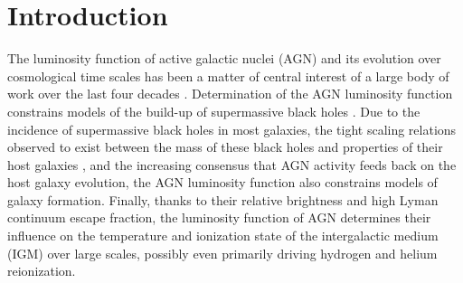 \documentclass[a4paper,fleqn,usenatbib]{mnras}
\begin{document}


\section{Introduction}

The luminosity function of active galactic nuclei (AGN) and its
evolution over cosmological time scales has been a matter of central
interest of a large body of work over the last four decades
\citep[e.g.,][]{1978A&A....68...17M, 1983ApJ...269..352S,
  1988ApJ...325...92K, 1988MNRAS.235..935B, 1993ApJ...406L..43H,
  1994ApJ...421..412W, 1995AJ....110...68S, 1995AJ....110.2553K,
  1995ApJ...438..623P, 2000MNRAS.317.1014B, 2001AJ....121...54F,
  2004AJ....128..515F, 2006AJ....131.2766R, 2007ApJ...654..731H,
  2009MNRAS.392...19C, 2010AJ....139..906W, 2011ApJ...728L..26G,
  2013ApJ...773...14R, 2013ApJ...768..105M, 2015AA...578A..83G,
  2015ApJ...798...28K, 2016ApJ...829...33Y, 2016ApJ...833..222J,
  2017MNRAS.466.1160M}.  Determination of the AGN luminosity function
constrains models of the build-up of supermassive black holes
\citep{2015MNRAS.452..575S, 2016MNRAS.462..190R}.  Due to the
incidence of supermassive black holes in most galaxies, the tight
scaling relations observed to exist between the mass of these black
holes and properties of their host galaxies
\citep{2013ARA&A..51..511K, 2013ApJ...764..184M}, and the increasing
consensus that AGN activity feeds back on the host galaxy evolution,
the AGN luminosity function also constrains models of galaxy
formation.  Finally, thanks to their relative brightness and high
Lyman continuum escape fraction, the luminosity function of AGN
determines their influence on the temperature and ionization state of
the intergalactic medium (IGM) over large scales, possibly even
primarily driving hydrogen and helium reionization.
\end{document}
